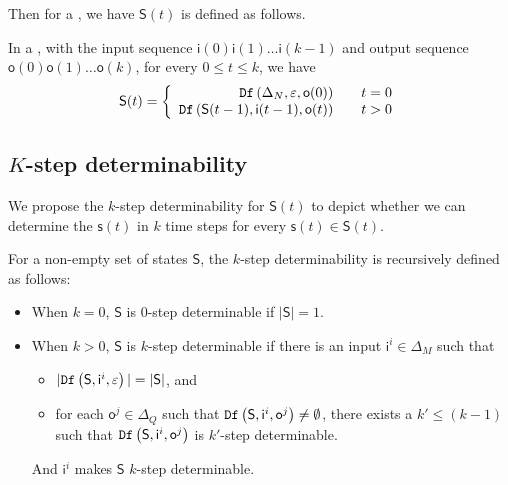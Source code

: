  Then for a \BCN, we have $\mathsf{S}(t)$ is defined as follows.
 \begin{definition}[$\mathsf{S}(t)$] In a \BCN, with the input sequence $\mathsf{i}(0)\mathsf{i}(1)\ldots\mathsf{i}(k-1)$ and output sequence $\mathsf{o}(0)\mathsf{o}(1)\ldots\mathsf{o}(k)$, for every $0\le t\le k$, we have
	\[\mathsf{S}(t)=\left\{
\begin{array}{rcl}
{\tt Df}\left(\Delta_N,\varepsilon,\mathsf{o}(0)\right)      &      & {t=0}\\
{\tt Df}\left(\mathsf{S}(t-1),\mathsf{i}(t-1),\mathsf{o}(t)\right)       &      & {t>0}
\end{array} \right. \]

\end{definition}
 
 
\subsection{$K$-step determinability}
 We propose the $k$-step determinability for $\mathsf{S}(t)$ to depict whether we can determine the $\mathsf{s}(t)$ in $k$ time steps for every $\mathsf{s}(t)\in \mathsf{S}(t)$. 
\begin{definition} 
For a non-empty  set of states $\mathsf{S}$, the $k$-step determinability is recursively defined as follows:
 \begin{itemize}
 \item When $k=0$, $\mathsf{S}$ is $0$-step determinable if $|\mathsf{S}|=1$. 
 \item When $k>0$, $\mathsf{S}$ is $k$-step determinable
 if there is an input $\mathsf{i}^{i} \in \Delta_M$ such that
 \begin{itemize}
 \item  $|{\tt Df}\left(\mathsf{S},\mathsf{i}^{i},\varepsilon\right)|=|\mathsf{S}|$, and 
 \item  for each $\mathsf{o}^{j}\in \Delta_Q$ such that ${\tt Df}\left(\mathsf{S},\mathsf{i}^{i},\mathsf{o}^{j}\right)\neq \emptyset$, there exists a ${k'}\le 
(k-1)$ such that ${\tt Df}\left(\mathsf{S},\mathsf{i}^{i},\mathsf{o}^{j}\right)$ is $k'$-step determinable.
 \end{itemize}
 And $\mathsf{i}^{i}$ makes $\mathsf{S}$ $k$-step determinable.
 \end{itemize}
\end{definition}

